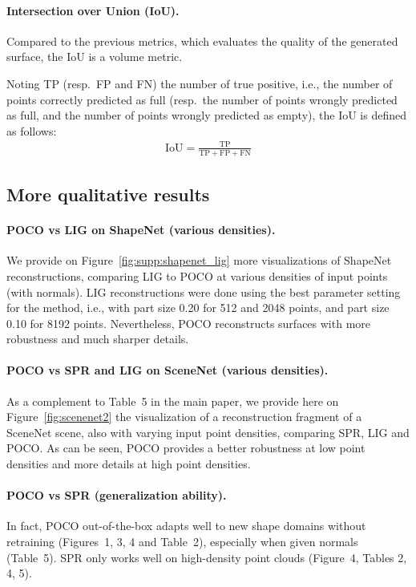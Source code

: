 \documentclass[10pt,twocolumn,letterpaper]{article}
\newcommand\OURS{{POCO}}
\begin{document}
\paragraph{Intersection over Union (IoU).}

Compared to the previous metrics, which evaluates the quality of the generated surface, the IoU is a volume metric.

Noting TP (resp.\ FP and FN) the number of true positive, i.e., the number of points correctly predicted as full (resp.\ the number of points wrongly predicted as full, and the number of points wrongly predicted as empty), the IoU is defined as follows:
\begin{align*}
    \text{IoU} = \frac{\text{TP}}{\text{TP} + \text{FP} + \text{FN}}
\end{align*}


\subsection{More qualitative results}

\paragraph{{\OURS} vs LIG on ShapeNet (various densities).}
We provide on Figure~\ref{fig:supp:shapenet_lig} more visualizations of ShapeNet reconstructions, comparing LIG to {\OURS} at various densities of input points (with normals). LIG reconstructions were done using the best parameter setting for the method, i.e., with part size 0.20 for 512 and 2048 points, and part size 0.10 for 8192 points. Nevertheless, {\OURS} reconstructs surfaces with more robustness and much sharper details.

\paragraph{{\OURS} vs SPR and LIG on SceneNet (various densities).}
As a complement to Table~5 in the main paper, we provide here on Figure~\ref{fig:scenenet2} the visualization of a reconstruction fragment of a SceneNet scene, also with varying input point densities, comparing SPR, LIG and {\OURS}.  As can be seen, {\OURS} provides a better robustness at low point densities and more details at high point densities.

\paragraph{{\OURS} vs SPR (generalization ability).}
In fact, {\OURS} out-of-the-box adapts well to new shape domains without retraining (Figures~1, 3, 4 and Table~2), especially when given normals (Table~5). 
SPR only works well on high-density point clouds (Figure~4, Tables 2, 4, 5).
\end{document}
